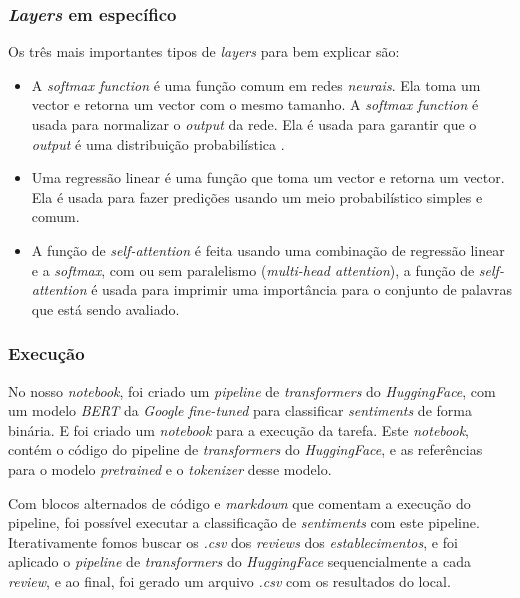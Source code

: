 \subsubsection{\textit{Layers} em específico}

Os três mais importantes tipos de \textit{layers} \cite{hf1} para bem explicar são:

\begin{itemize}
    \item A \textit{softmax function} é uma função comum em redes \textit{neurais}. Ela toma um vector e retorna um vector com o mesmo tamanho. A \textit{softmax function} é usada para normalizar o \textit{output} da rede. Ela é usada para garantir que o \textit{output} é uma distribuição probabilística \cite{mft1}.
    \item Uma regressão linear é uma função que toma um vector e retorna um vector. Ela é usada para fazer predições usando um meio probabilístico simples e comum.
    \item A função de \textit{self-attention} é feita usando uma combinação de regressão linear e a \textit{softmax}, com ou sem paralelismo (\textit{multi-head attention}), a função de \textit{self-attention} é usada para imprimir uma importância para o conjunto de palavras que está sendo avaliado.
\end{itemize}

\subsubsection{Execução}

No nosso \textit{notebook}, foi criado um \textit{pipeline} de \textit{transformers} do \textit{HuggingFace}, com um modelo \textit{BERT} da \textit{Google} \textit{fine-tuned}\cite{hf1} para classificar \textit{sentiments} de forma binária. E foi criado um \textit{notebook} para a execução da tarefa. Este \textit{notebook}, contém o código do pipeline de \textit{transformers} do \textit{HuggingFace}, e as referências para o modelo \textit{pretrained} e o \textit{tokenizer} desse modelo.

Com blocos alternados de código e \textit{markdown} que comentam a execução do pipeline, foi possível executar a classificação de \textit{sentiments} com este pipeline. Iterativamente fomos buscar os \textit{.csv} dos \textit{reviews} dos \textit{establecimentos}, e foi aplicado o \textit{pipeline} de \textit{transformers} do \textit{HuggingFace} sequencialmente a cada \textit{review}, e ao final, foi gerado um arquivo \textit{.csv} com os resultados do local.

